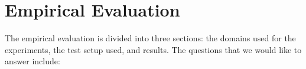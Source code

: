 \documentclass[letterpaper]{article}
\newenvironment{packed_itemize}{
\begin{itemize}
  \setlength{\itemsep}{1pt}
  \setlength{\parskip}{0pt}
  \setlength{\parsep}{0pt}
}{\end{itemize}}
\begin{document}
 



\section{Empirical Evaluation}
The empirical evaluation is divided into three sections:  the domains used for
the experiments, the test setup used, and results.  The questions that we would like to answer
include:


% 
\end{document}

